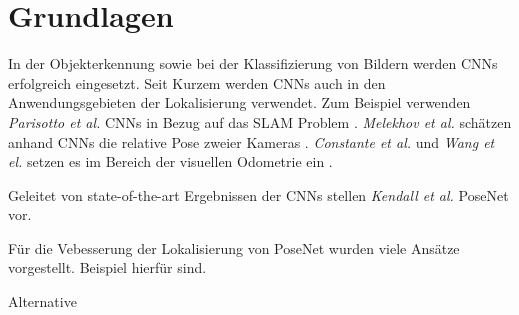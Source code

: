 \pagebreak
\section{Grundlagen}





\pagebreak
In der Objekterkennung \cite{girshickRichFeatureHierarchies2013, girshickFastRCNN2015} sowie bei der Klassifizierung von Bildern \cite{krizhevskyImageNetClassificationDeep2012, heDeepResidualLearning2015} werden CNNs erfolgreich eingesetzt.
Seit Kurzem werden CNNs auch in den Anwendungsgebieten der Lokalisierung verwendet. Zum Beispiel verwenden \textit{Parisotto et al.} CNNs in Bezug auf das SLAM Problem \cite{parisottoGlobalPoseEstimation2018}. \textit{Melekhov et al.} schätzen anhand CNNs die relative Pose zweier Kameras \cite{melekwashovRelativeCameraPose2017}. \textit{Constante et al.} und \textit{Wang et el.} setzen es im Bereich der visuellen Odometrie ein \cite{costanteExploringRepresentationLearning2016, wangDeepVOEndtoendVisual2017}.

Geleitet von state-of-the-art Ergebnissen der CNNs stellen \textit{Kendall et al.} PoseNet vor.

Für die Vebesserung der Lokalisierung von PoseNet wurden viele Ansätze vorgestellt. Beispiel hierfür sind.



Alternative 


% 
